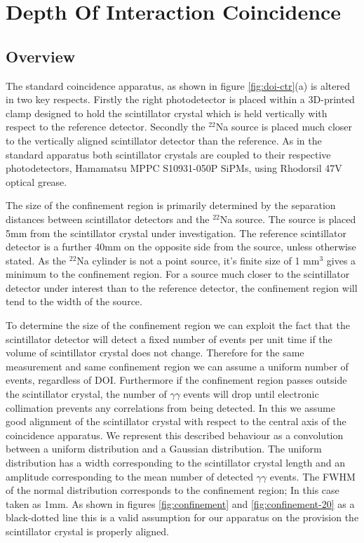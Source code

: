 \section{Depth Of Interaction Coincidence}
\subsection{Overview}
The standard coincidence apparatus, as shown in figure \ref{fig:doi-ctr}(a) is altered in two key respects. Firstly the right photodetector is placed within a 3D-printed clamp designed to hold the scintillator crystal which is held vertically with respect to the reference detector. Secondly the $^{22}$Na source is placed much closer to the vertically aligned scintillator detector than the reference. As in the standard apparatus both scintillator crystals are coupled to their respective photodetectors, Hamamatsu MPPC S10931-050P SiPMs, using Rhodorsil 47V optical grease. 

The size of the confinement region is primarily determined by the separation distances between scintillator detectors and the $^{22}$Na source. The source is placed 5mm from the scintillator crystal under investigation. The reference scintillator detector is a further 40mm on the opposite side from the source, unless otherwise stated. As the $^{22}$Na cylinder is not a point source, it's finite size of 1 mm$^3$ gives a minimum to the confinement region. For a source much closer to the scintillator detector under interest than to the reference detector, the confinement region will tend to the width of the source. 

To determine the size of the confinement region we can exploit the fact that the scintillator detector will detect a fixed number of events per unit time if the volume of scintillator crystal does not change. Therefore for the same measurement and same confinement region we can assume a uniform number of events, regardless of DOI. Furthermore if the confinement region passes outside the scintillator crystal, the number of $\gamma\gamma$ events will drop until electronic collimation prevents any correlations from being detected. In this we assume good alignment of the scintillator crystal with respect to the central axis of the coincidence apparatus. We represent this described behaviour as a convolution between a uniform distribution and a Gaussian distribution. The uniform distribution has a width corresponding to the scintillator crystal length and an amplitude corresponding to the mean number of detected $\gamma\gamma$ events. The FWHM of the normal distribution corresponds to the confinement region; In this case taken as 1mm. As shown in figures \ref{fig:confinement} and \ref{fig:confinement-20} as a black-dotted line this is a valid assumption for our apparatus on the provision the scintillator crystal is properly aligned.

